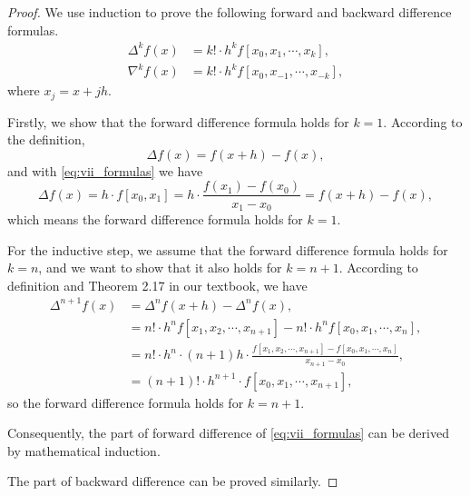 \documentclass[a4paper]{article}
\begin{document}
\begin{proof}
  We use induction to prove the following forward and backward difference formulas.
  \begin{equation}
    \begin{aligned}
      \Delta^k f(x) &= k! \cdot h^k f[x_0, x_1, \cdots, x_k], \\
      \nabla^k f(x) &= k! \cdot h^k f[x_0, x_{-1}, \cdots, x_{-k}],
    \end{aligned}
    \label{eq:vii_formulas}
  \end{equation}
  where $x_j = x + jh$.

  Firstly, we show that the forward difference formula holds for $k = 1$.
  According to the definition, 
  \begin{equation}
    \Delta f(x) = f(x + h) - f(x),
    \label{eq:vii_forward_def}
  \end{equation}
  and with \cref{eq:vii_formulas} we have 
  \begin{equation}
    \Delta f(x) = h \cdot f[x_0, x_1] = h \cdot \frac{f(x_1) - f(x_0)}{x_1 - x_0} = f(x + h) - f(x),
  \end{equation}
  which means the forward difference formula holds for $k = 1$.

  For the inductive step, we assume that the forward difference formula holds for $k = n$, and we want to show that it also holds for $k = n + 1$.
  According to definition and Theorem 2.17 in our textbook, we have
  \begin{equation}
    \begin{aligned}
      \Delta^{n + 1} f(x) &= \Delta^n f(x + h) - \Delta^n f(x), \\
      &= n! \cdot h^n f[x_1, x_2, \cdots, x_{n + 1}] - n! \cdot h^n f[x_0, x_1, \cdots, x_n], \\
      &= n! \cdot h^n \cdot (n + 1)h \cdot \frac{f[x_1, x_2, \cdots, x_{n + 1}] - f[x_0, x_1, \cdots, x_n]}{x_{n + 1} - x_0}, \\
      &= (n + 1)! \cdot h^{n + 1} \cdot f[x_0, x_1, \cdots, x_{n + 1}],
    \end{aligned}
    \label{eq:vii_forward_induction}
  \end{equation}
  so the forward difference formula holds for $k = n + 1$. 
  
  Consequently, the part of forward difference of \cref{eq:vii_formulas} can be derived by mathematical induction. 

  The part of backward difference can be proved similarly.
\end{proof}
\end{document}
